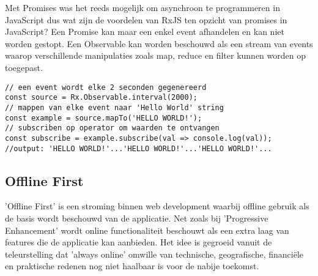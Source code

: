 Met Promises \autocite{promise-info} was het reeds mogelijk om asynchroon te programmeren in JavaScript dus wat zijn de voordelen van RxJS ten opzicht van promises in JavaScript? Een Promise kan maar een enkel event afhandelen en kan niet worden gestopt. Een Observable kan worden beschouwd als een stream van events waarop verschillende manipulaties zoals map, reduce en filter kunnen worden op toegepast.
\begin{lstlisting}[caption=Voorbeeld de mapTo operator in RxJS]
// een event wordt elke 2 seconden gegenereerd
const source = Rx.Observable.interval(2000);
// mappen van elke event naar 'Hello World' string
const example = source.mapTo('HELLO WORLD!');
// subscriben op operator om waarden te ontvangen
const subscribe = example.subscribe(val => console.log(val));
//output: 'HELLO WORLD!'...'HELLO WORLD!'...'HELLO WORLD!'...

\end{lstlisting}
\subsection{Offline First}
'Offline First' is een stroming \autocite{offline-first} binnen web development waarbij offline gebruik als de basis wordt beschouwd van de applicatie. Net zoals bij 'Progressive Enhancement' wordt online functionaliteit beschouwt als een extra laag van features die de applicatie kan aanbieden. Het idee is gegroeid vanuit de teleurstelling dat 'always online' omwille van technische, geografische, financi\"ele en praktische redenen nog niet haalbaar is voor de nabije toekomst.
\clearpage
